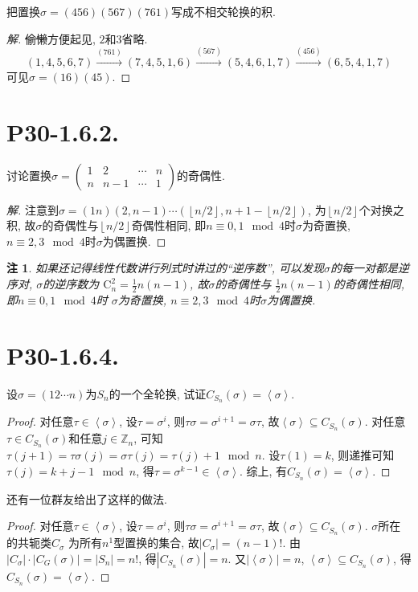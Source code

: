\documentclass[12pt, a4paper, fontset=windows]{ctexart}
\newcommand{\Z}{\mathbb{Z}}
\newcommand{\abs}[1]{\left|{#1}\right|}
\newcommand{\floor}[1]{\left\lfloor{#1}\right\rfloor}
\newcommand{\gen}[1]{\left\langle{#1}\right\rangle}
\newcommand{\rto}[1]{\stackrel{#1}{\longrightarrow}}
\newcommand{\yh}[1]{“{#1}”} %
\def\pmat#1{\begin{pmatrix}#1\end{pmatrix}}
\newtheorem*{remark}{注}
\newenvironment{solution}{\begin{proof}[解]}{\end{proof}}
\begin{document}
把置换$\sigma=(456)(567)(761)$写成不相交轮换的积. 

\begin{solution}
\sout{偷懒}方便起见, $2$和$3$省略. 
\[(1,4,5,6,7)\rto{(761)}(7,4,5,1,6)\rto{(567)}(5,4,6,1,7)\rto{(456)}(6,5,4,1,7)\]
可见$\sigma=(16)(45)$. 
\end{solution}

\section*{P30-1.6.2.}

讨论置换$\sigma=\pmat{1&2&\cdots&n\\n&n-1&\cdots&1}$的奇偶性. 

\begin{solution}
注意到$\sigma=(1n)(2,n-1)\cdots(\floor{n/2},n+1-\floor{n/2})$, 
为$\floor{n/2}$个对换之积, 
故$\sigma$的奇偶性与$\floor{n/2}$奇偶性相同, 
即$n\equiv 0,1\mod{4}$时$\sigma$为奇置换, 
$n\equiv 2,3\mod{4}$时$\sigma$为偶置换. 
\end{solution}

\begin{remark}
如果还记得线性代数讲行列式时讲过的\yh{逆序数}, 
可以发现$\sigma$的每一对都是逆序对, $\sigma$的逆序数为
$\mathrm{C}^2_n=\frac12n(n-1)$, 故$\sigma$的奇偶性与
$\frac12n(n-1)$的奇偶性相同, 即$n\equiv 0,1\mod{4}$时
$\sigma$为奇置换, $n\equiv 2,3\mod{4}$时$\sigma$为偶置换. 
\end{remark}

\section*{P30-1.6.4.}

设$\sigma=(12\cdots n)$为$S_n$的一个全轮换, 
试证$C_{S_n}(\sigma)=\gen{\sigma}$. 

\begin{proof}
对任意$\tau\in\gen{\sigma}$, 设$\tau=\sigma^i$, 
则$\tau\sigma=\sigma^{i+1}=\sigma\tau$, 
故$\gen{\sigma}\subseteq C_{S_n}(\sigma)$. 
对任意$\tau\in C_{S_n}(\sigma)$和任意$j\in\Z_n$, 
可知$\tau(j+1)=\tau\sigma(j)=\sigma\tau(j)
=\tau(j)+1\mod{n}$. 设$\tau(1)=k$, 则递推可知
$\tau(j)=k+j-1\mod{n}$, 得$\tau=\sigma^{k-1}\in\gen{\sigma}$. 
综上, 有$C_{S_n}(\sigma)=\gen{\sigma}$. 
\end{proof}

还有一位群友给出了这样的做法. 

\begin{proof}
对任意$\tau\in\gen{\sigma}$, 设$\tau=\sigma^i$, 
则$\tau\sigma=\sigma^{i+1}=\sigma\tau$, 
故$\gen{\sigma}\subseteq C_{S_n}(\sigma)$. 
$\sigma$所在的共轭类$C_\sigma$
为所有$n^1$型置换的集合, 故$\abs{C_\sigma}=(n-1)!$. 
由$\abs{C_\sigma}\cdot\abs{C_G(\sigma)}=\abs{S_n}=n!$, 
得$\abs{C_{S_n}(\sigma)}=n$. 又$\abs{\gen{\sigma}}=n$, 
$\gen{\sigma}\subseteq C_{S_n}(\sigma)$, 
得$C_{S_n}(\sigma)=\gen{\sigma}$. 
\end{proof}
\end{document}
